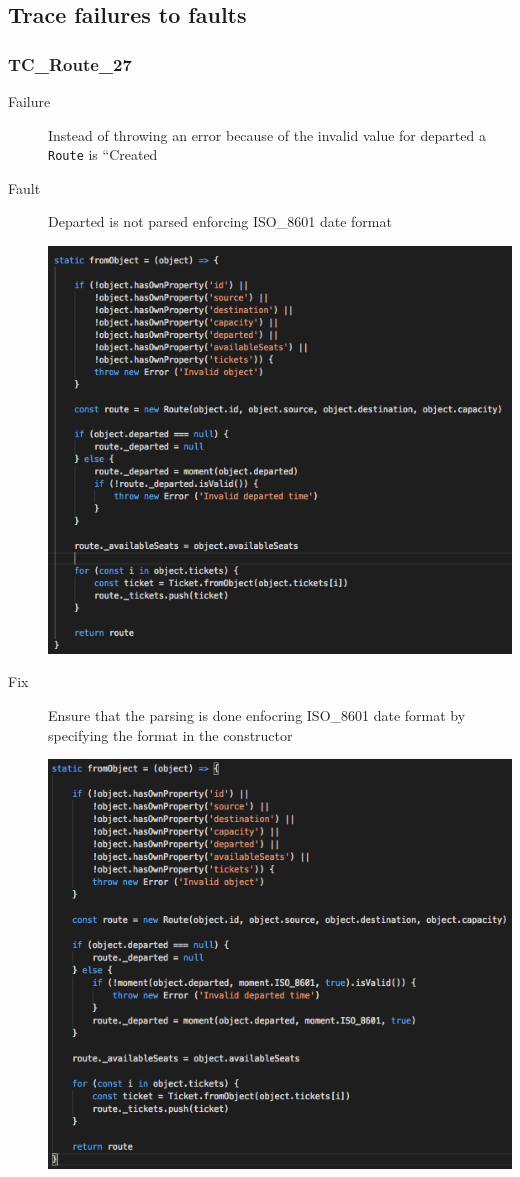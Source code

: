 \documentclass[11pt]{article}
\begin{document}
\subsection{Trace failures to faults}
\label{sec:org51839e8}

\subsubsection{TC\_Route\_27}
\label{sec:orgfa19ee7}

\begin{description}
\item[{Failure}] Instead of throwing an error because of the invalid value for departed a \texttt{Route} is “Created
\item[{Fault}] Departed is not parsed enforcing ISO\_8601 date format
\begin{center}
\includegraphics[width=.9\linewidth]{./Iteration2.rtfd/Pasted Graphic 8.tiff.png}
\end{center}
\item[{Fix}] Ensure that the parsing is done enfocring ISO\_8601 date format by specifying the format in the constructor
\begin{center}
\includegraphics[width=.9\linewidth]{./Iteration2.rtfd/Pasted Graphic 7.tiff.png}

\end{center}
\end{description}
\end{document}
